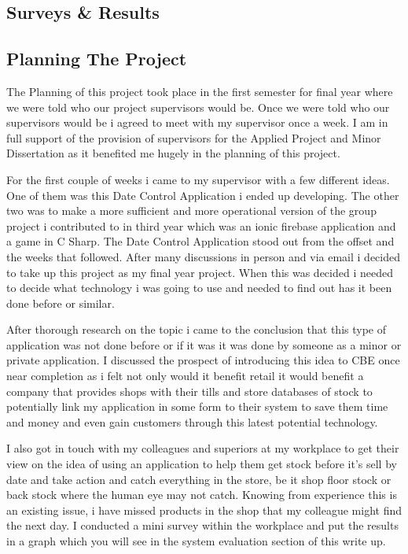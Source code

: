 \subsection{Surveys \& Results}

\subsection{Planning The Project}
The Planning of this project took place in the first semester for final year where we were told who our project supervisors would be. Once we were told who our supervisors would be i agreed to meet with my supervisor once a week. I am in full support of the provision of supervisors for the Applied Project and Minor Dissertation as it benefited me hugely in the planning of this project. 
\newline

For the first couple of weeks i came to my supervisor with a few different ideas. One of them was this Date Control Application i ended up developing. The other two was to make a more sufficient and more operational version of the group project i contributed to in third year which was an ionic firebase application and a game in C Sharp. The Date Control Application stood out from the offset and the weeks that followed. After many discussions in person and via email i decided to take up this project as my final year project. When this was decided i needed to decide what technology i was going to use and needed to find out has it been done before or similar. 
\newline

After thorough research on the topic i came to the conclusion that this type of application was not done before or if it was it was done by someone as a minor or private application. I discussed the prospect of introducing this idea to CBE once near completion as i felt not only would it benefit retail it would benefit a company that provides shops with their tills and store databases of stock to potentially link my application in some form to their system to save them time and money and even gain customers through this latest potential technology. 
\newline

I also got in touch with my colleagues and superiors at my workplace to get their view on the idea of using an application to help them get stock before it's sell by date and take action and catch everything in the store, be it shop floor stock or back stock where the human eye may not catch. Knowing from experience this is an existing issue, i have missed products in the shop that my colleague might find the next day. I conducted a mini survey within the workplace and put the results in a graph which you will see in the system evaluation section of this write up. 
\newline

